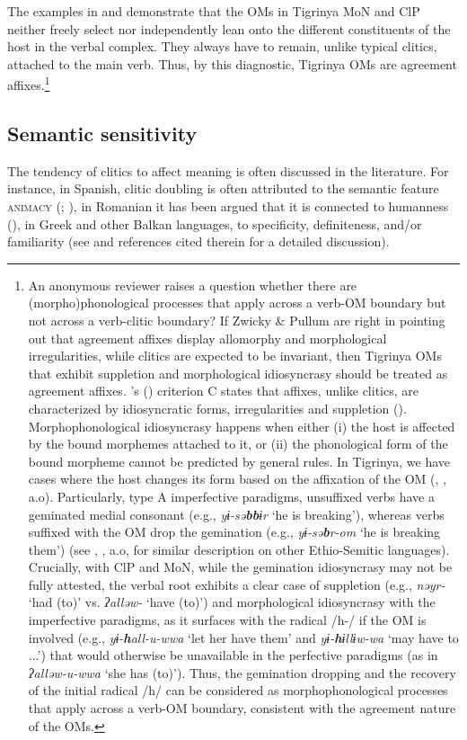 \documentclass[output=paper]{langscibook}
\begin{document}
The examples in  and  demonstrate that the OMs in Tigrinya MoN and ClP neither freely select nor independently lean onto the different constituents of the host in the verbal complex. They always have to remain, unlike typical clitics, attached to the main verb. Thus, by this diagnostic, Tigrinya OMs are agreement affixes.\footnote{An anonymous reviewer raises a question whether there are (morpho)phonological processes that apply across a verb-OM boundary but not across a verb-clitic boundary? If Zwicky \& Pullum are right in pointing out that agreement affixes display allomorphy and morphological irregularities, while clitics are expected to be invariant, then Tigrinya OMs that exhibit suppletion and morphological idiosyncrasy should be treated as agreement affixes. \citeauthor{zwickyandpullum}'s (\citeyear{zwickyandpullum}) criterion C states that affixes, unlike clitics, are characterized by idiosyncratic forms, irregularities and suppletion (\citeyear[505]{zwickyandpullum}). Morphophonological idiosyncrasy happens when either (i) the host is affected by the bound morphemes attached to it, or (ii) the phonological form of the bound morpheme cannot be predicted by general rules. In Tigrinya, we have cases where the host changes its form based on the affixation of the OM (\citealt{berhane91}, \citealt{buckley00}, a.o). Particularly, type A imperfective paradigms, unsuffixed verbs have a geminated medial consonant (e.g., \emph{yɨ-sə{\textbf{bb}}ɨr} `he is breaking'), whereas verbs suffixed with the OM drop the gemination (e.g., \emph{yɨ-sə{\textbf{b}}r-om} `he is breaking them') (see \citealt{lowenstamm96}, \citealt{rose97}, a.o, for similar description on other Ethio-Semitic languages). Crucially, with ClP and MoN, while the gemination idiosyncrasy may not be fully attested, the verbal root exhibits a clear case of suppletion (e.g., \emph{nəyr-} `had (to)' vs. \emph{ʔalləw-} `have (to)') and morphological idiosyncrasy with the imperfective paradigms, as it surfaces with the radical /h-/ if the OM is involved (e.g., \emph{yɨ-{\textbf{h}}all-u-wwa} `let her have them' and \emph{yɨ-{\textbf{h}}ɨllɨw-wa} `may have to ...') that would otherwise be unavailable in the perfective paradigms (as in \emph{ʔalləw-u-wwa} `she has (to)'). Thus, the gemination dropping and the recovery of the initial radical /h/ can be considered as morphophonological processes that apply across a verb-OM boundary, consistent with the agreement nature of the OMs.}

\subsection{Semantic sensitivity}
The tendency of clitics to affect meaning is often discussed in the literature. For instance, in Spanish, clitic doubling is often attributed to the semantic feature {\scshape animacy} (\citealt{jaeggli86}; \citealt{romero10}), in Romanian it has been argued that it is connected to humanness (\citealt{dobrovie90}), in Greek and other Balkan languages, to specificity, definiteness, and/or familiarity (see \citealt{kallulli08} and references cited therein for a detailed discussion). 
\end{document}
